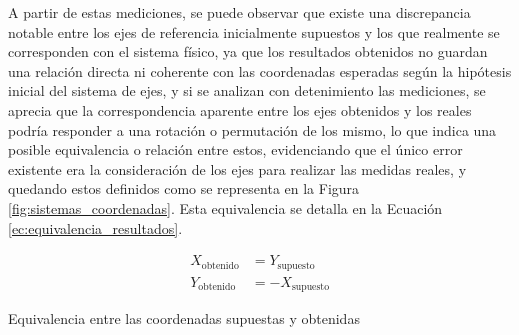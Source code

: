 A partir de estas mediciones, se puede observar que existe una discrepancia notable entre los ejes de referencia inicialmente supuestos y los que realmente se corresponden con el sistema físico, ya que los resultados obtenidos no guardan una relación directa ni coherente con las coordenadas esperadas según la hipótesis inicial del sistema de ejes, y si se analizan con detenimiento las mediciones, se aprecia que la correspondencia aparente entre los ejes obtenidos y los reales podría responder a una rotación o permutación de los mismo, lo que indica una posible equivalencia o relación entre estos, evidenciando que el único error existente era la consideración de los ejes para realizar las medidas reales, y quedando estos definidos como se representa en la Figura \ref{fig:sistemas_coordenadas}. Esta equivalencia se detalla en la Ecuación \ref{ec:equivalencia_resultados}.

  \begin{myequation}[H]
    \begin{align}
      X_{\text{obtenido}} &= Y_{\text{supuesto}}
      \nonumber \\
      Y_{\text{obtenido}} &= -X_{\text{supuesto}}  
      \nonumber
    \end{align}
    \caption{Equivalencia entre las coordenadas supuestas y obtenidas}
    \label{ec:equivalencia_resultados}
  \end{myequation}


